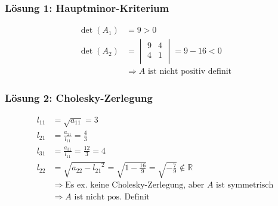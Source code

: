 \subsubsection*{Lösung 1: Hauptminor-Kriterium}

\begin{align}
	\det(A_1) &= 9 > 0\\
	\det(A_2) &= 
		\begin{vmatrix}
			9 & 4 \\
			4 & 1 \\
		\end{vmatrix} = 9 - 16 < 0\\
	&\Rightarrow \text{$A$ ist nicht positiv definit}
\end{align}

\subsubsection*{Lösung 2: Cholesky-Zerlegung}
\begin{align}
	l_{11} &= \sqrt{a_{11}} = 3\\
	l_{21} &= \frac{a_{21}}{l_{11}} = \frac{4}{3}\\
	l_{31} &= \frac{a_{31}}{l_{11}} = \frac{12}{3} = 4\\
	l_{22} &= \sqrt{a_{22} - {l_{21}}^2} = \sqrt{1 - \frac{16}{9}}= \sqrt{-\frac{7}{9}} \notin \mathbb{R}\\
 & \Rightarrow \text{Es ex. keine Cholesky-Zerlegung, aber $A$ ist symmetrisch}\\
 & \Rightarrow \text{$A$ ist nicht pos. Definit}
\end{align}
